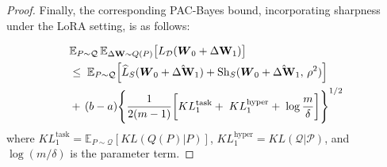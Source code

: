 \documentclass[letterpaper]{article} %
\begin{document}
\begin{proof}


Finally, the corresponding PAC-Bayes bound, incorporating sharpness under the LoRA setting, is as follows:



\begin{align}
& \mathbb{E}_{P \sim \mathcal{Q}}\, \mathbb{E}_{\Delta\mathbf{W} \sim Q(P)} 
    \big[ L_{\mathcal{D}}(\boldsymbol{W}_0 + \Delta\mathbf{W}_1) \big] \notag \\
&\leq\; \mathbb{E}_{P \sim \mathcal{Q}} \Big[
        \widehat{L}_S(\boldsymbol{W}_0 + \hat{\Delta\mathbf{W}}_1)
        + \mathrm{Sh}_S(\boldsymbol{W}_0 + \hat{\Delta\mathbf{W}}_1,\, \rho^2)
    \Big] \notag \\
&+\, (b-a) \Bigg\{
        \frac{1}{2(m-1)} \bigg[
            KL^{\text{task}}_1 \notag 
            +\; KL^{\text{hyper}}_1 \notag 
            +\; \log\frac{m}{\delta}
        \bigg]
    \Bigg\}^{1/2}
\label{eq:single-task-pac-bayes}
\end{align}
where $KL^{\text{task}}_1 = \mathbb{E}_{P \sim \mathcal{Q}}\left[ KL(Q(P)|P) \right]$,
$KL^{\text{hyper}}_1 = KL(\mathcal{Q}|\mathcal{P})$,
and $\log(m/\delta)$ is the parameter term.






\end{proof}
\end{document}
